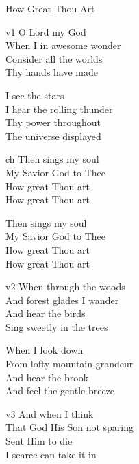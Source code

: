 \begin{song}{How Great Thou Art}
    

    \begin{songframe}{v1}
        O Lord my God \\
        When I in awesome wonder \\
        Consider all the worlds \\
        Thy hands have made

        I see the stars \\
        I hear the rolling thunder \\
        Thy power throughout \\
        The universe displayed
    \end{songframe}

    \begin{songframe}{ch}
        Then sings my soul \\
        My Savior God to Thee \\
        How great Thou art \\
        How great Thou art 

        Then sings my soul \\
        My Savior God to Thee \\
        How great Thou art \\
        How great Thou art
    \end{songframe}

    \begin{songframe}{v2}
        When through the woods \\
        And forest glades I wander \\
        And hear the birds \\
        Sing sweetly in the trees

        When I look down \\
        From lofty mountain grandeur \\
        And hear the brook \\
        And feel the gentle breeze
    \end{songframe}

    \begin{songframe}{v3}
        And when I think \\
        That God His Son not sparing \\
        Sent Him to die \\
        I scarce can take it in


\end{songframe}
\end{song}
